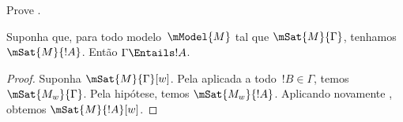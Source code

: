 \documentclass[../../../include/open-logic-section]{subfiles}
\begin{document}
\begin{prob}
  Prove . 
\end{prob}

\begin{prop}
  Suponha que, para todo modelo~$\mModel{M}$ tal que
  $\mSat{M}{\Gamma}$, tenhamos $\mSat{M}{!A}$. Então
  $\Gamma \Entails !A$.
\end{prop}

\begin{proof}
  Suponha $\mSat{M}{\Gamma}[w]$. Pela  aplicada
  a todo~$!B \in \Gamma$, temos $\mSat{M_w}{\Gamma}$. Pela hipótese,
  temos $\mSat{M_w}{!A}$. Aplicando novamente
  , obtemos $\mSat{M}{!A}[w]$.
\end{proof}
\end{document}
